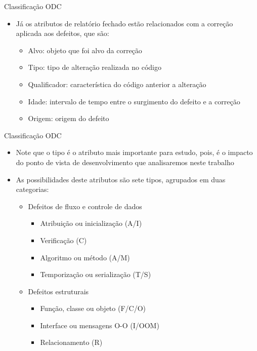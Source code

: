 \documentclass[brazilian]{beamer}
\begin{document}
\begin{frame}{Classificação ODC}
    \begin{itemize}
        \item Já os atributos de relatório fechado estão relacionados com a correção aplicada aos defeitos, que são:
        \begin{itemize}
            \item Alvo: objeto que foi alvo da correção
            \item Tipo: tipo de alteração realizada no código
            \item Qualificador: característica do código anterior a alteração
            \item Idade: intervalo de tempo entre o surgimento do defeito e a correção
            \item Origem: origem do defeito
        \end{itemize}
    \end{itemize}
\end{frame}

\begin{frame}{Classificação ODC}
    \begin{itemize}
        \item Note que o tipo é o atributo mais importante para estudo, pois, é o impacto do ponto de vista de desenvolvimento que analisaremos neste trabalho
        \item As possibilidades deste atributos são sete tipos, agrupados em duas categorias:
        \begin{itemize}
            \item Defeitos de fluxo e controle de dados
            \begin{itemize}
                \item Atribuição ou inicialização (A/I)
                \item Verificação (C)
                \item Algoritmo ou método (A/M)
                \item Temporização ou serialização (T/S)
            \end{itemize}
            \item Defeitos estruturais
            \begin{itemize}
                \item Função, classe ou objeto (F/C/O)
                \item Interface ou mensagens O-O (I/OOM)
                \item Relacionamento (R)
            \end{itemize}
        \end{itemize}
    \end{itemize}
\end{frame}
\end{document}
